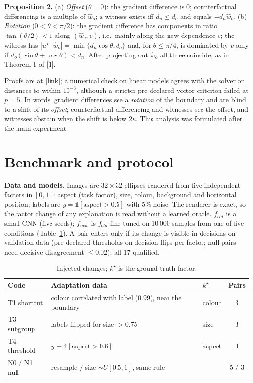 \documentclass{esannV2}
\begin{document}
\textbf{Proposition 2.} (a) \emph{Offset} ($\theta=0$): the gradient difference is $0$; counterfactual differencing is a multiple of $\hat w_o$; a witness exists iff $d_n\le d_o$ and equals $-d_n\hat w_o$. (b) \emph{Rotation} ($0<\theta<\pi/2$): the gradient difference has components in ratio $\tan(\theta/2)<1$ along $(\hat w_o,v)$, i.e.\ mainly along the new dependence $v$; the witness has $|u^\star\!\cdot\hat w_o|=\min\{d_n\cos\theta,d_o\}$ and, for $\theta\le\pi/4$, is dominated by $v$ only if $d_o(\sin\theta+\cos\theta)<d_n$. After projecting out $\hat w_o$ all three coincide, as in Theorem 1 of [1].

Proofs are at [link]; a numerical check on linear models agrees with the solver on distances to within $10^{-3}$, although a stricter pre-declared vector criterion failed at $p=5$. In words, gradient differences see a \emph{rotation} of the boundary and are blind to a shift of its \emph{offset}; counterfactual differencing and witnesses see the offset, and witnesses abstain when the shift is below $2\kappa$. This analysis was formulated after the main experiment.

\section{Benchmark and protocol}

\textbf{Data and models.} Images are $32\times32$ ellipses rendered from five independent factors in $[0,1]$: aspect (task factor), size, colour, background and horizontal position; labels are $y=\mathbb 1[\text{aspect}>0.5]$ with 5\% noise. The renderer is exact, so the factor change of any explanation is read without a learned oracle. $f_{old}$ is a small CNN (five seeds); $f_{new}$ is $f_{old}$ fine-tuned on 10\,000 samples from one of five conditions (Table~\ref{tab:changes}). A pair enters only if its change is visible in decisions on validation data (pre-declared thresholds on decision flips per factor; null pairs need decisive disagreement $\le0.02$); all 17 qualified.

\begin{table}[t]
\caption{Injected changes; $k^\star$ is the ground-truth factor.}
\label{tab:changes}
\centering\footnotesize
\begin{tabular}{lllc}
\toprule
Code & Adaptation data & $k^\star$ & Pairs\\
\midrule
T1 shortcut & colour correlated with label (0.99), near the boundary & colour & 3\\
T3 subgroup & labels flipped for size $>0.75$ & size & 3\\
T4 threshold & $y=\mathbb 1[\text{aspect}>0.6]$ & aspect & 3\\
N0 / N1 null & resample / size $\sim U[0.5,1]$, same rule & --- & 5 / 3\\
\bottomrule
\end{tabular}
\end{table}
\end{document}
